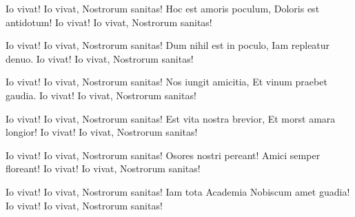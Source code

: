 \begin{verse*}
Io vivat! Io vivat,
Nostrorum sanitas!
Hoc est amoris poculum,
Doloris est antidotum!
Io vivat! Io vivat,
Nostrorum sanitas!
\end{verse*}

\begin{verse*}
Io vivat! Io vivat,
Nostrorum sanitas!
Dum nihil est in poculo,
Iam repleatur denuo.
Io vivat! Io vivat,
Nostrorum sanitas!
\end{verse*}

\begin{verse*}
Io vivat! Io vivat,
Nostrorum sanitas!
Nos iungit amicitia,
Et vinum praebet gaudia.
Io vivat! Io vivat,
Nostrorum sanitas!
\end{verse*}

\begin{verse*}
Io vivat! Io vivat,
Nostrorum sanitas!
Est vita nostra brevior,
Et morst amara longior!
Io vivat! Io vivat,
Nostrorum sanitas!
\end{verse*}

\begin{verse*}
Io vivat! Io vivat,
Nostrorum sanitas!
Osores nostri pereant!
Amici semper floreant!
Io vivat! Io vivat,
Nostrorum sanitas!
\end{verse*}

\begin{verse*}
Io vivat! Io vivat,
Nostrorum sanitas!
Iam tota Academia
Nobiscum amet guadia!
Io vivat! Io vivat,
Nostrorum sanitas!
\end{verse*}
